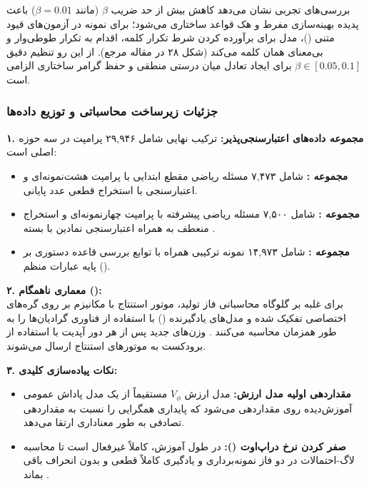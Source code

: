 بررسی‌های تجربی \cite{lambert2024tulu3} نشان می‌دهد کاهش بیش از حد ضریب $\beta$ (مانند $\beta = 0.01$) باعث پدیده بهینه‌سازی مفرط و هک قواعد ساختاری می‌شود؛ برای نمونه در آزمون‌های قیود متنی ()، مدل برای برآورده کردن شرط تکرار کلمه، اقدام به تکرار طوطی‌وار و بی‌معنای همان کلمه می‌کند (شکل ۲۸ در مقاله مرجع). از این رو تنظیم دقیق $\beta \in [0.05, 0.1]$ برای ایجاد تعادل میان درستی منطقی و حفظ گرامر ساختاری الزامی است.

\subsubsection*{جزئیات زیرساخت محاسباتی و توزیع داده‌ها}

\textbf{۱. مجموعه داده‌های اعتبارسنجی‌پذیر:} ترکیب نهایی شامل ۲۹,۹۴۶ پرامپت در سه حوزه اصلی است:
\begin{itemize}
    \item \textbf{مجموعه :} شامل ۷,۴۷۳ مسئله ریاضی مقطع ابتدایی با پرامپت هشت‌نمونه‌ای  و اعتبارسنجی با استخراج قطعی عدد پایانی.
    \item \textbf{مجموعه :} شامل ۷,۵۰۰ مسئله ریاضی پیشرفته با پرامپت چهار‌نمونه‌ای و استخراج منعطف به همراه اعتبارسنجی نمادین با بسته .
    \item \textbf{مجموعه :} شامل ۱۴,۹۷۳ نمونه ترکیبی همراه با توابع بررسی قاعده دستوری بر پایه عبارات منظم ().
\end{itemize}

\textbf{۲. معماری ناهمگام ():} \\
برای غلبه بر گلوگاه محاسباتی فاز تولید، موتور استنتاج  \cite{kwon2023efficient} با مکانیزم  بر روی گره‌های اختصاصی تفکیک شده و مدل‌های یادگیرنده () با استفاده از فناوری  \cite{rajbhandari2020zero} گرادیان‌ها را به طور همزمان محاسبه می‌کنند \cite{noukhovitch2024asynchronous}. وزن‌های جدید پس از هر دور آپدیت با استفاده از برودکست  به موتورهای استنتاج ارسال می‌شوند.

\textbf{۳. نکات پیاده‌سازی کلیدی:}
\begin{itemize}
    \item \textbf{مقداردهی اولیه مدل ارزش:} مدل ارزش $V_\phi$ مستقیماً از یک مدل پاداش عمومی آموزش‌دیده روی  مقداردهی می‌شود که پایداری همگرایی را نسبت به مقداردهی تصادفی به طور معناداری ارتقا می‌دهد.
    \item \textbf{صفر کردن نرخ دراپ‌اوت ():} در طول آموزش،  کاملاً غیرفعال است تا محاسبه لاگ-احتمالات در دو فاز نمونه‌برداری و یادگیری کاملاً قطعی و بدون انحراف باقی بماند \cite{huang2024implementation}.
\end{itemize}

